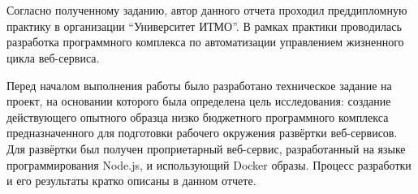 \section*{}

Согласно полученному заданию, автор данного отчета проходил преддипломную практику в организации “Университет ИТМО”.
В рамках практики проводилась разработка программного комплекса по автоматизации управлением жизненного цикла веб-сервиса.

Перед началом выполнения работы было разработано техническое задание на проект, на основании которого была определена цель исследования:
создание действующего опытного образца низко бюджетного программного комплекса предназначенного для подготовки рабочего окружения развёртки веб-сервисов.
Для развёртки был получен проприетарный веб-сервис, разработанный на языке программирования Node.js, и использующий Docker образы.
Процесс разработки и его результаты кратко описаны в данном отчете.

